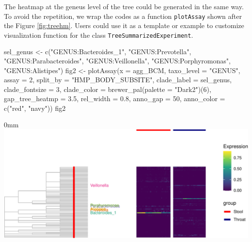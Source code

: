 \documentclass[]{article}
\newcommand{\hlnum}[1]{\textcolor[rgb]{0.816,0.125,0.439}{#1}}%
\newcommand{\hlstr}[1]{\textcolor[rgb]{0.251,0.627,0.251}{#1}}%
\newcommand{\hlstd}[1]{\textcolor[rgb]{0.251,0.251,0.251}{#1}}%
\newcommand{\hlkwc}[1]{\textcolor[rgb]{0.251,0.251,0.251}{#1}}%
\newcommand{\hlkwd}[1]{\textcolor[rgb]{0.878,0.439,0.125}{#1}}%
\newenvironment{Shaded}{\begin{myshaded}}{\end{myshaded}}
\newcommand{\KeywordTok}[1]{\hlkwd{#1}}
\newcommand{\DataTypeTok}[1]{\hlkwc{#1}}
\newcommand{\DecValTok}[1]{\hlnum{#1}}
\newcommand{\FloatTok}[1]{\hlnum{#1}}
\newcommand{\StringTok}[1]{\hlstr{#1}}
\newcommand{\NormalTok}[1]{\hlstd{#1}}
\begin{document}
The heatmap at the geneus level of the tree could be generated in the same way. To avoid the repetition, we wrap the codes as a function \texttt{plotAssay} shown after the Figure \ref{fig:treehm}. Users could use it as a template or example to customize visualization function for the class \texttt{TreeSummarizedExperiment}.

\begin{Shaded}
\begin{Highlighting}[]
\NormalTok{sel_genus <-}\StringTok{ }\KeywordTok{c}\NormalTok{(}\StringTok{"GENUS:Bacteroides_1"}\NormalTok{, }\StringTok{"GENUS:Prevotella"}\NormalTok{,}
               \StringTok{"GENUS:Parabacteroides"}\NormalTok{, }\StringTok{"GENUS:Veillonella"}\NormalTok{,}
               \StringTok{"GENUS:Porphyromonas"}\NormalTok{, }\StringTok{"GENUS:Alistipes"}\NormalTok{)}
\NormalTok{fig2 <-}\StringTok{ }\KeywordTok{plotAssay}\NormalTok{(}\DataTypeTok{x =}\NormalTok{ agg_BCM, }
                  \DataTypeTok{taxo_level =} \StringTok{"GENUS"}\NormalTok{,}
                  \DataTypeTok{assay =} \DecValTok{2}\NormalTok{, }
                  \DataTypeTok{split_by =} \StringTok{"HMP_BODY_SUBSITE"}\NormalTok{, }
                  \DataTypeTok{clade_label =}\NormalTok{ sel_genus,}
                  \DataTypeTok{clade_fontsize =} \DecValTok{3}\NormalTok{,}
                  \DataTypeTok{clade_color =} \KeywordTok{brewer_pal}\NormalTok{(}\DataTypeTok{palette =} \StringTok{"Dark2"}\NormalTok{)(}\DecValTok{6}\NormalTok{),}
                  \DataTypeTok{gap_tree_heatmp =} \FloatTok{3.5}\NormalTok{,}
                  \DataTypeTok{rel_width =} \FloatTok{0.8}\NormalTok{, }
                  \DataTypeTok{anno_gap =} \DecValTok{50}\NormalTok{,}
                  \DataTypeTok{anno_color =} \KeywordTok{c}\NormalTok{(}\StringTok{"red"}\NormalTok{, }\StringTok{"navy"}\NormalTok{))}
\NormalTok{fig2}
\end{Highlighting}
\end{Shaded}

\begin{adjustwidth}{\fltoffset}{0mm}
\includegraphics{figure/treehm-1} \end{adjustwidth}
\end{document}
